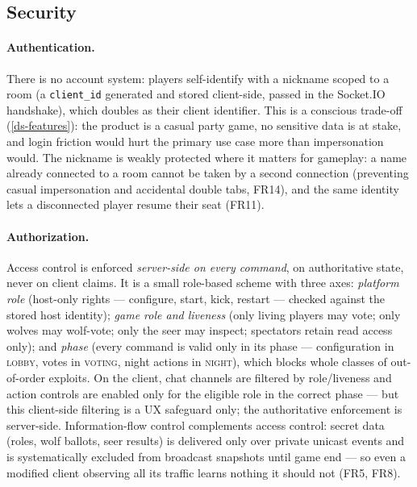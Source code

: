 \documentclass{scrartcl}
\begin{document}
\subsection{Security}\label{security}

\paragraph{Authentication.}
There is no account system: players self-identify with a nickname scoped to a
room (a \texttt{client\_id} generated and stored client-side, passed in the
Socket.IO handshake), which doubles as their client identifier. This is a
conscious trade-off (\cref{ds-features}): the product is a casual party game, no
sensitive data is at stake, and login friction would hurt the primary use case
more than impersonation would. The nickname is weakly protected where it matters
for gameplay: a name already connected to a room cannot be taken by a second
connection (preventing casual impersonation and accidental double tabs, FR14),
and the same identity lets a disconnected player resume their seat (FR11).

\paragraph{Authorization.}
Access control is enforced \emph{server-side on every command}, on authoritative
state, never on client claims. It is a small role-based scheme with three axes:
\emph{platform role} (host-only rights --- configure, start, kick, restart ---
checked against the stored host identity); \emph{game role and liveness} (only
living players may vote; only wolves may wolf-vote; only the seer may inspect;
spectators retain read access only); and \emph{phase} (every command is valid
only in its phase --- configuration in \textsc{lobby}, votes in \textsc{voting},
night actions in \textsc{night}), which blocks whole classes of out-of-order
exploits. On the client, chat channels are filtered by role/liveness and action
controls are enabled only for the eligible role in the correct phase --- but this
client-side filtering is a UX safeguard only; the authoritative enforcement is
server-side. Information-flow control complements access control: secret data
(roles, wolf ballots, seer results) is delivered only over private unicast events
and is systematically excluded from broadcast snapshots until game end --- so even
a modified client observing all its traffic learns nothing it should not (FR5,
FR8).
\end{document}
